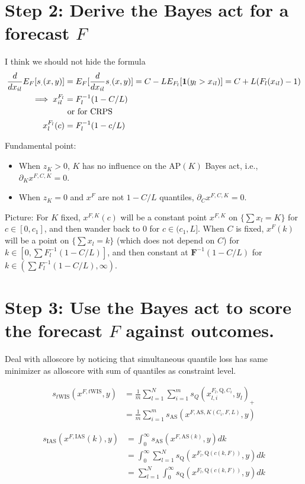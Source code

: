 \documentclass{article}
\begin{document}
\section{Step 2: Derive the Bayes act for a forecast $F$}

I think we should not hide the formula 
\begin{align}
\frac{d {} }{d {x_{il}}} E_F[s_{.}(x,y)] &= E_{F}[\frac{d {} }{d {x_{il}}} s_{.}(x,y)] = C - LE_{F_l}[\mathbf{1}(y_l > x_{il})] = C + L(F_l(x_{il}) - 1) \\
\implies x_{il}^{F_l} &= F_l^{-1}(1 - C/L) \\
&\text{ or for CRPS} \\
x_{l}^{F_l}(c) &= F_l^{-1}(1 - c/L)
\end{align}

Fundamental point: 
\begin{itemize}
\item When $z_K > 0$, $K$ has no influence on the $\mathrm{AP}(K)$ Bayes act, i.e., $\partial_K x^{F,C,K} = 0$.  
\item When $z_K=0$ and $x^F$ are not $1-C/L$ quantiles, $\partial_C x^{F,C,K} = 0$.
\end{itemize}

Picture: For $K$ fixed, $x^{F,K}(c)$ will be a constant point $x^{F,K}$ on $\{\sum x_l = K\}$ for $c \in [0, c_1]$, 
and then wander back to 0 for $c \in (c_1,L]$. When $C$ is fixed, $x^{F}(k)$ will be a point on $\{\sum x_l = k\}$ (which does not depend on $C$)
for $k \in [0, \sum F_l^{-1}(1-C/L)]$, and then constant at $\mathbf{F}^{-1}(1-C/L)$ for $k \in (\sum F_l^{-1}(1-C/L), \infty)$.

\section{Step 3: Use the Bayes act to score the forecast $F$ against outcomes.}

Deal with alloscore by noticing that simultaneous quantile loss has same minimizer as alloscore with sum of quantiles as constraint level.

\begin{align}
s_{t\mathrm{WIS}}(x^{F,t\mathrm{WIS}},y) &= \frac{1}{m}\sum_{l=1}^N \sum_{i=1}^{m}s_{Q}(x_{l,i}^{F_l,\mathrm{Q}, C_i}, y_l)_+ \\ 
&= \frac{1}{m} \sum_{i=1}^{m}s_{\mathrm{AS}}(x^{F,\mathrm{AS},  K(C_i, F, L)},y) 
\end{align}

\begin{align}
s_{\mathrm{IAS}}(x^{F, \mathrm{IAS}}(k), y) &= \int_0^{\infty} s_{\mathrm{AS}}(x^{F, \mathrm{AS}(k)}, y) dk \\
&= \int_0^{\infty} \sum_{l=1}^N s_{\mathrm{Q}}(x^{F_l, \mathrm{Q}(c(k, F))}, y) dk \\
&= \sum_{l=1}^N \int_0^{\infty} s_{\mathrm{Q}}(x^{F_l, \mathrm{Q}(c(k, F))}, y) dk
\end{align}
\end{document}
